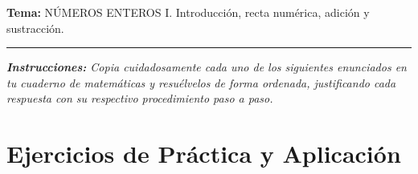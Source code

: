 \documentclass[12pt, letterpaper]{article}
\begin{document}
	\vspace{0.2cm}
	\noindent \textbf{Tema:} NÚMEROS ENTEROS I. Introducción, recta numérica, adición y sustracción.
	\vspace{0.2cm}
	\hrule
	\vspace{0.4cm}
	
	\noindent \textit{\textbf{Instrucciones:} Copia cuidadosamente cada uno de los siguientes enunciados en tu cuaderno de matemáticas y resuélvelos de forma ordenada, justificando cada respuesta con su respectivo procedimiento paso a paso.}
	\vspace{0.6cm}
	
	\section*{Ejercicios de Práctica y Aplicación}
	
\end{document}
